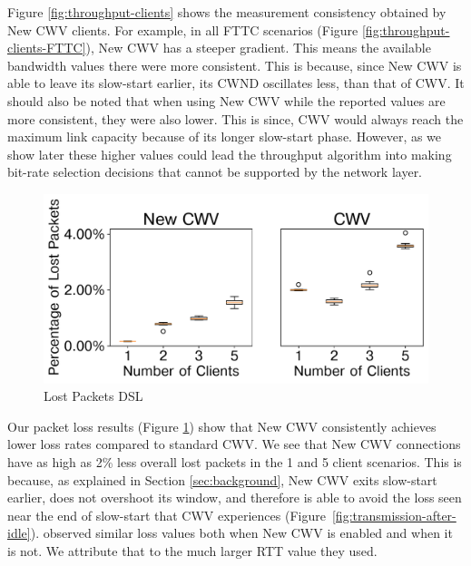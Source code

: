 \documentclass[10pt,sigconf,anonymous]{acmart}
\begin{document}
Figure \ref{fig:throughput-clients} shows the measurement consistency obtained by New CWV clients. For example, in all FTTC scenarios (Figure \ref{fig:throughput-clients-FTTC}), New CWV has a steeper gradient. This means the available bandwidth values there were more consistent. This is because, since New CWV is able to leave its slow-start earlier, its CWND oscillates less, than that of CWV. It should also be noted that when using New CWV while the reported values are more consistent, they were also lower. This is since, CWV would always reach the maximum link capacity because of its longer slow-start phase. However, as we show later these higher values could lead the throughput algorithm into making bit-rate selection decisions that cannot be supported by the network layer.

\begin{figure}[t!]
  \centering
  \includegraphics[width=.45\textwidth]{figures/lost_packets.pdf}
  \caption{Lost Packets DSL}
  \label{fig:lost-packets}
\end{figure}

Our packet loss results (Figure \ref{fig:lost-packets}) show that New CWV consistently achieves lower loss rates compared to standard CWV. We see that New CWV connections have as high as 2\% less overall lost packets in the 1 and 5 client scenarios. This is because, as explained in Section \ref{sec:background}, New CWV exits slow-start earlier, does not overshoot its window, and therefore is able to avoid the loss seen near the end of slow-start that CWV experiences (Figure~\ref{fig:transmission-after-idle}). \cite{Nazir-2014-performance-evaluation-congestion-window-validation-dash-newcwv} observed similar loss values both when New CWV is enabled and when it is not. We attribute that to the much larger RTT value they used.

\end{document}

